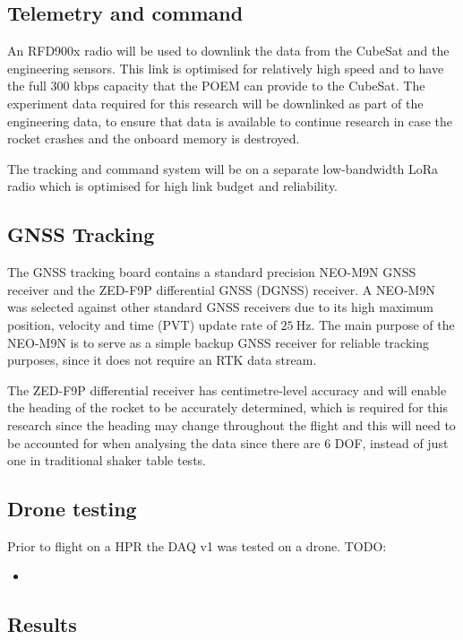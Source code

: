 \documentclass[a4paper,11pt]{article}
\begin{document}
\subsection{Telemetry and command}
An RFD900x radio will be used to downlink the data from the CubeSat and the engineering sensors. This link is optimised for relatively high speed and to have the full 300 kbps capacity that the POEM can provide to the CubeSat. The experiment data required for this research will be downlinked as part of the engineering data, to ensure that data is available to continue research in case the rocket crashes and the onboard memory is destroyed.

The tracking and command system will be on a separate low-bandwidth LoRa radio which is optimised for high link budget and reliability.


\subsection{GNSS Tracking}

The GNSS tracking board contains a standard precision NEO-M9N GNSS receiver and the ZED-F9P differential GNSS (DGNSS) receiver. A NEO-M9N was selected against other standard GNSS receivers due to its high maximum position, velocity and time (PVT) update rate of $\SI{25}{\hertz}$. The main purpose of the NEO-M9N is to serve as a simple backup GNSS receiver for reliable tracking purposes, since it does not require an RTK data stream.

The ZED-F9P differential receiver has centimetre-level accuracy and will enable the heading of the rocket to be accurately determined, which is required for this research since the heading may change throughout the flight and this will need to be accounted for when analysing the data since there are 6 DOF, instead of just one in traditional shaker table tests.

\subsection{Drone testing}
Prior to flight on a HPR the DAQ v1 was tested on a drone. 
TODO:

\begin{itemize}
  \item 
\end{itemize}

\subsection{Results}
\end{document}
